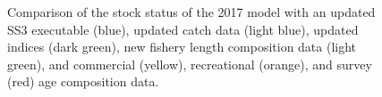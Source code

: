 \documentclass[
]{scrartcl}
\begin{document}
\begin{figure}


\caption{\label{fig-newdata_4}Comparison of the stock status of the 2017
model with an updated SS3 executable (blue), updated catch data (light
blue), updated indices (dark green), new fishery length composition data
(light green), and commercial (yellow), recreational (orange), and
survey (red) age composition data.}

\end{figure}%
\end{document}

